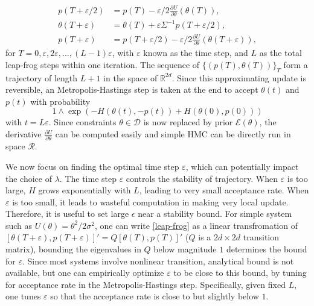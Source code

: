 \documentclass[10pt]{article}
\newcommand{\mc}[1]{\mathcal{#1}}
\DeclareMathOperator{\1}{\mathbbm{1}}
\begin{document}
\begin{equation}
\begin{aligned}
\label{leap-frog}
p(T+ \varepsilon/2) & = p(T) - \varepsilon/2 \frac{\partial U}{\partial  \theta } ( \theta (T)),\\
 \theta (T + \varepsilon) & =  \theta (T) + \varepsilon \Sigma^{-1}p(T+  \varepsilon/2),\\
p(T+ \varepsilon) &= p(T+ \varepsilon/2) - \varepsilon/2 \frac{\partial U}{\partial  \theta } ( \theta (T + \varepsilon)),
\end{aligned}
\end{equation}
for $T=0,\varepsilon, 2\varepsilon,\ldots, (L-1)\varepsilon$, with $\varepsilon$ known as the time step, and $L$ as the total leap-frog steps within one iteration. The sequence of $\{(p(T),\theta(T))\}_T$ form a trajectory of length $L+1$ in the space of $\mathbb R^{2d}$. Since this approximating update is reversible, an Metropolis-Hastings step is taken at the end to accept $\theta(t)$ and $p(t)$ with probability 
$$1\wedge \exp  \left( - H(\theta(t),-p(t)) + H(\theta(0),p(0))\right)$$
 with $t=L\varepsilon$. Since constraints $\theta \in \mc D$ is now replaced by prior $\mc E(\theta)$, the derivative $\frac{\partial U}{\partial  \theta }$ can be computed easily and simple HMC can be directly run in space $\mc R$.

We now focus on finding the optimal time step $\varepsilon$, which can potentially impact the choice of $\lambda$. The time step $\varepsilon$ controls the stability of trajectory. When $\varepsilon$ is too large, $H$ grows exponentially with $L$, leading to very small acceptance rate. When $\varepsilon$ is too small, it leads to wasteful computation in making very local update. Therefore, it is useful to set large $\epsilon$ near a stability bound. For simple system such as $U(\theta)= {\theta^2}/{2\sigma^2}$, one can write \eqref{leap-frog} as a linear transfromation of $[\theta(T+\varepsilon),p(T+\varepsilon)]' = Q [ \theta(T),p(T)]'$ ($Q$ is a $2d\times 2d$ transition matrix), bounding the eigenvalues in $Q$ below magnitude $1$ determines the bound for $\varepsilon$. Since most systems involve nonlinear transition, analytical bound is not available, but one can empirically optimize $\varepsilon$ to be close to this bound, by tuning for acceptance rate in the Metropolis-Hastings step. Specifically, given fixed $L$, one tunes $\varepsilon$ so that the acceptance rate is close to but slightly below $1$.
\end{document}

